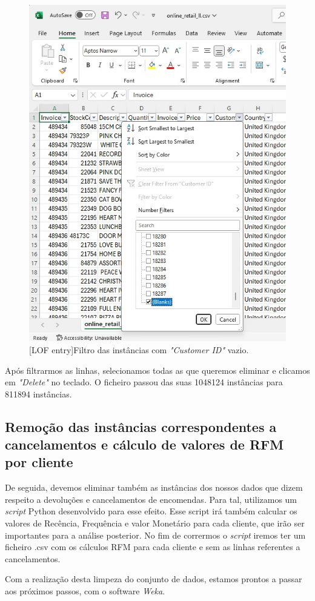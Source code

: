 \documentclass{easychair}
\begin{document}
\begin{figure}[H]
    \begin{centering}
    \includegraphics[width=0.55\linewidth]{imagens/figure1.jpg}\label{cap-2-fig1}
    [LOF entry]{Filtro das instâncias com \textit{"Customer ID"} vazio.}
    \label{fig1}
    \end{centering}
\end{figure}

Após filtrarmos as linhas, selecionamos todas as que queremos eliminar e clicamos em \textit{"Delete"} no teclado. O ficheiro passou das suas 1048124 instâncias para 811894 instâncias.

\subsection{Remoção das instâncias correspondentes a cancelamentos e cálculo de valores de RFM por cliente}

De seguida, devemos eliminar também as instâncias dos nossos dados que dizem respeito a devoluções e cancelamentos de encomendas.  Para tal, utilizamos um \textit{script} Python desenvolvido para esse efeito. Esse script irá também calcular os valores de Recência, Frequência e valor Monetário para cada cliente, que irão ser importantes para a análise posterior.
No fim de corrermos o \textit{script} iremos ter um ficheiro .csv com os cálculos RFM para cada cliente e sem as linhas referentes a cancelamentos.

Com a realização desta limpeza do conjunto de dados, estamos prontos a passar aos próximos passos, com o software \textit{Weka}\cite{weka}.
\end{document}

